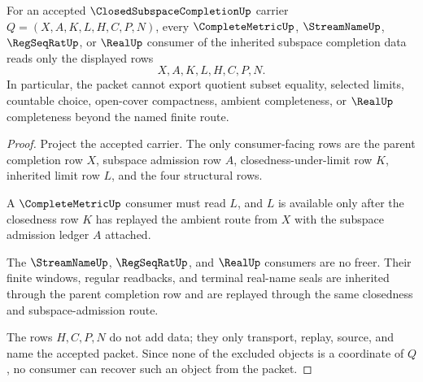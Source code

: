\begin{theorem}
\label{thm:closed-subspace-completion-nonescape-boundary}
For an accepted $\ClosedSubspaceCompletionUp$ carrier $Q=(X,A,K,L,H,C,P,N)$, every $\CompleteMetricUp$, $\StreamNameUp$, $\RegSeqRatUp$, or $\RealUp$ consumer of the inherited subspace completion data reads only the displayed rows
$$
X,A,K,L,H,C,P,N .
$$
In particular, the packet cannot export quotient subset equality, selected limits, countable choice, open-cover compactness, ambient completeness, or $\RealUp$ completeness beyond the named finite route.
\end{theorem}
\begin{proof}
Project the accepted carrier. The only consumer-facing rows are the parent completion row $X$, subspace admission row $A$, closedness-under-limit row $K$, inherited limit row $L$, and the four structural rows.

A $\CompleteMetricUp$ consumer must read $L$, and $L$ is available only after the closedness row $K$ has replayed the ambient route from $X$ with the subspace admission ledger $A$ attached.

The $\StreamNameUp$, $\RegSeqRatUp$, and $\RealUp$ consumers are no freer. Their finite windows, regular readbacks, and terminal real-name seals are inherited through the parent completion row and are replayed through the same closedness and subspace-admission route.

The rows $H,C,P,N$ do not add data; they only transport, replay, source, and name the accepted packet. Since none of the excluded objects is a coordinate of $Q$, no consumer can recover such an object from the packet.
\end{proof}


\begin{closurestatus}{\ClosedSubspaceCompletionUp}
  \theoryclosure{\seedClosure}
  \formalstatus{\unformalizedV}
\end{closurestatus}
